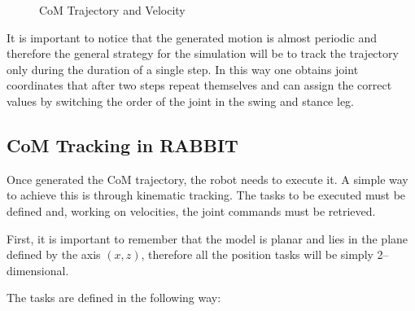 \documentclass[11pt]{article}
\begin{document}
\begin{figure}[H]
\centering
{}
\caption{CoM Trajectory and Velocity}
\end{figure}
It is important to notice that the generated motion is almost periodic and therefore the general strategy for the simulation will be to track the trajectory only during the duration of a single step. In this way one obtains joint coordinates that after two steps repeat themselves and can assign the correct values by switching the order of the joint in the swing and stance leg.

\subsection{CoM Tracking in RABBIT}

Once generated the CoM trajectory, the robot needs to execute it. A simple way to achieve this is through kinematic tracking. The tasks to be executed must be defined and, working on velocities, the joint commands must be retrieved.

First, it is important to remember that the model is planar and lies in the plane defined by the axis $(x,z)$, therefore all the position tasks will be simply 2--dimensional.

The tasks are defined in the following way:
\end{document}
